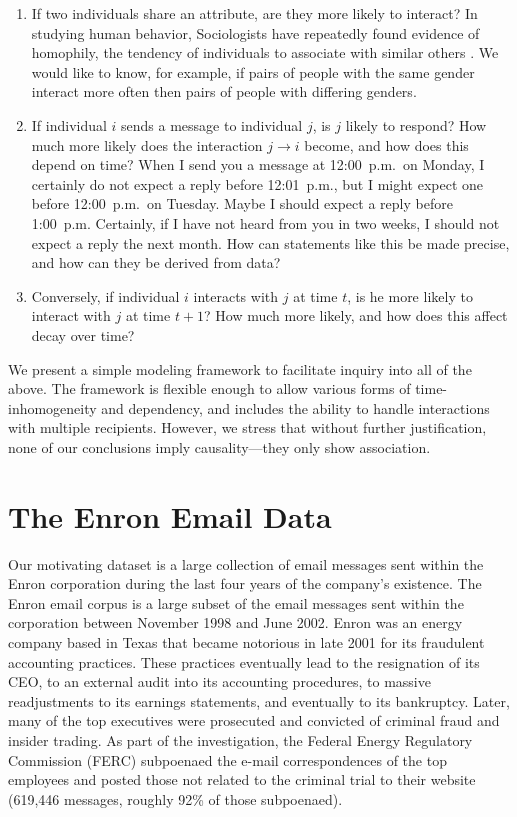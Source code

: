 \documentclass[aoas,preprint]{imsart}
\begin{document}
\begin{enumerate}

    \item If two individuals share an attribute, are they more likely to
    interact? In studying human behavior, Sociologists have repeatedly found
    evidence of homophily, the tendency of individuals to associate with
    similar others \cite{mcpherson2001birds}. We would like to know, for
    example, if pairs of people with the same gender interact more often then
    pairs of people with differing genders.

    \item If individual $i$ sends a message to individual $j$, is $j$ likely
    to respond? How much more likely does the interaction $j \to i$ become,
    and how does this depend on time? When I send you a message at 12:00~p.m.\
    on Monday, I certainly do not expect a reply before 12:01~p.m., but I
    might expect one before 12:00~p.m.\ on Tuesday. Maybe I should expect a
    reply before 1:00~p.m. Certainly, if I have not heard from you in two
    weeks, I should not expect a reply the next month. How can statements like
    this be made precise, and how can they be derived from data?

    \item Conversely, if individual $i$ interacts with $j$ at time $t$, is he
    more likely to interact with $j$ at time $t+1$? How much more likely, and
    how does this affect decay over time?

\end{enumerate}

We present a simple modeling framework to facilitate inquiry into all of the
above. The framework is flexible enough to allow various forms of
time-inhomogeneity and dependency, and includes the ability to handle
interactions with multiple recipients. However, we stress that without further
justification, none of our conclusions imply causality---they only show
association.


\section{The Enron Email Data}

Our motivating dataset is a large collection of email messages sent within the
Enron corporation during the last four years of the company's existence. The
Enron email corpus is a large subset of the email messages sent within the
corporation between November 1998 and June 2002. Enron was an energy company
based in Texas that became notorious in late 2001 for its fraudulent
accounting practices. These practices eventually lead to the resignation of
its CEO, to an external audit into its accounting procedures, to massive
readjustments to its earnings statements, and eventually to its bankruptcy.
Later, many of the top executives were prosecuted and convicted of criminal
fraud and insider trading. As part of the investigation, the Federal Energy
Regulatory Commission (FERC) subpoenaed the e-mail correspondences of the top
employees and posted those not related to the criminal trial to their website
(619,446 messages, roughly 92\% of those subpoenaed).
\end{document}
